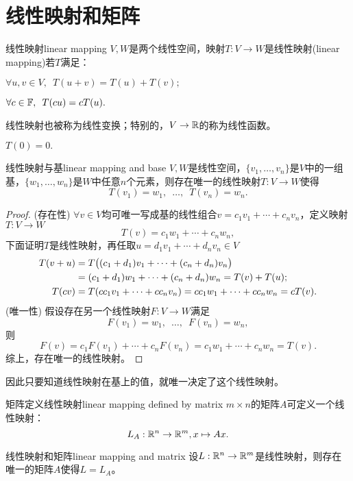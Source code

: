 \section{线性映射和矩阵}
\begin{definition}{线性映射}{linear mapping}
	$V,W$是两个线性空间，映射$T:V\to W$是线性映射(linear mapping)若$T$满足：
	\begin{compactenum}
		\item $\forall u,v\in V,\enspace T(u+v)=T(u)+T(v);$
		\item $\forall c\in\mathbb F,\enspace T(cu)=cT(u).$
	\end{compactenum}
	线性映射也被称为线性变换；特别的，$V\to\mathbb R$的称为线性函数。
\end{definition}
\begin{corollary}
	$T(0)=0.$
\end{corollary}
\begin{theorem}{线性映射与基}{linear mapping and base}
	$V,W$是线性空间，$\{v_1,\ldots,v_n\}$是$V$中的一组基，$\{w_1,\ldots,w_n\}$是$W$中任意$n$个元素，则存在唯一的线性映射$T:V\to W$使得
	\[
		T(v_1)=w_1,\enspace\ldots,\enspace T(v_n)=w_n.
	\]
\end{theorem}
\begin{proof}
	(存在性) $\forall v\in V$均可唯一写成基的线性组合$v=c_1v_1+\cdots+c_nv_n$，定义映射$T:V\to W$
	\[
		T(v)=c_1w_1+\cdots+c_nw_n,
	\]
	下面证明$T$是线性映射，再任取$u=d_1v_1+\cdots+d_nv_n\in V$
	\begin{align*}
		T(v+u)&=T\bigl((c_1+d_1)v_1+\cdots+(c_n+d_n)v_n\bigr)\\
		&=(c_1+d_1)w_1+\cdots+(c_n+d_n)w_n=T(v)+T(u);\\
		T(cv)&=T(cc_1v_1+\cdots+cc_nv_n)=cc_1w_1+\cdots+cc_nw_n=cT(v).
	\end{align*}
	(唯一性) 假设存在另一个线性映射$F:V\to W$满足
	\[
		F(v_1)=w_1,\enspace\ldots,\enspace F(v_n)=w_n,
	\]
	则 
	\[
		F(v)=c_1F(v_1)+\cdots+c_nF(v_n)=c_1w_1+\cdots+c_nw_n=T(v).
	\]
	综上，存在唯一的线性映射。
\end{proof}
因此只要知道线性映射在基上的值，就唯一决定了这个线性映射。
\begin{example}{矩阵定义线性映射}{linear mapping defined by matrix}
	$m\times n$的矩阵$A$可定义一个线性映射：
	\begin{equation}
		L_A:\mathbb R^n\to\mathbb R^m,x\mapsto Ax.
	\end{equation}
\end{example}
\begin{theorem}{线性映射和矩阵}{linear mapping and matrix}
	设$L:\mathbb R^n\to\mathbb R^m$是线性映射，则存在唯一的矩阵$A$使得$L=L_A$。
\end{theorem}
